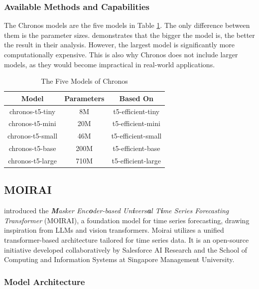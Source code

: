 \documentclass[12pt,a4paper]{article}
\begin{document}
\subsubsection{Available Methods and Capabilities}

The Chronos models are the five models in Table \ref{chronosmodels}. The only difference between them is the parameter sizes. \cite{ansari2024chronos} demonstrates that the bigger the model is, the better the result in their analysis. However, the largest model is significantly more computationally expensive. This is also why Chronos does not include larger models, as they would become impractical in real-world applications. 

\begin{table}[ht]
  \centering
  \caption{The Five Models of Chronos \parencite{ansari2024chronos}}
  \label{chronosmodels}
  \begin{tabular}{ccc} %
  \toprule
  \textbf{Model} & \textbf{Parameters} & \textbf{Based On} \\ 
  \midrule
  chronos-t5-tiny & 8M & t5-efficient-tiny \\ 
  chronos-t5-mini & 20M & t5-efficient-mini \\ 
  chronos-t5-small & 46M & t5-efficient-small \\ 
  chronos-t5-base & 200M & t5-efficient-base \\ 
  chronos-t5-large & 710M & t5-efficient-large \\ 
  \bottomrule
  \end{tabular}
\end{table}

\subsection{MOIRAI}

\cite{woo2024unified} introduced the \textit{\textbf{M}asker Enc\textbf{o}der-based Un\textbf{i}vers\textbf{a}l T\textbf{i}me Series Forecasting Transformer} (MOIRAI), a foundation model for time series forecasting, drawing inspiration from LLMs and vision transformers. Moirai utilizes a unified transformer-based architecture tailored for time series data. It is an open-source initiative developed collaboratively by Salesforce AI Research and the School of Computing and Information Systems at Singapore Management University.

\subsubsection{Model Architecture}
\end{document}
